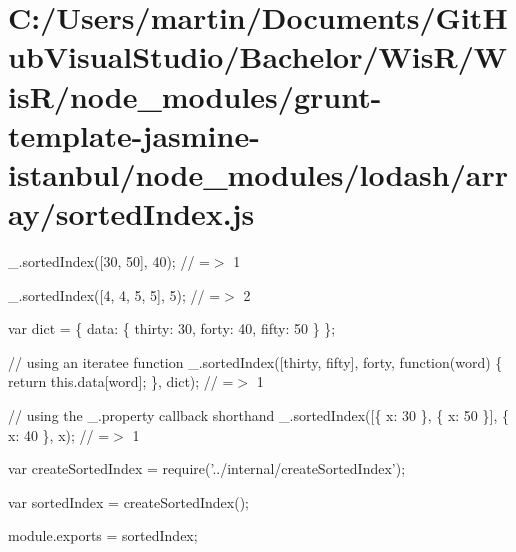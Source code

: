\hypertarget{_c_1_2_users_2martin_2_documents_2_git_hub_visual_studio_2_bachelor_2_wis_r_2_wis_r_2node_module6b893fce4ef2730ca2766808678960da}{}\section{C\+:/\+Users/martin/\+Documents/\+Git\+Hub\+Visual\+Studio/\+Bachelor/\+Wis\+R/\+Wis\+R/node\+\_\+modules/grunt-\/template-\/jasmine-\/istanbul/node\+\_\+modules/lodash/array/sorted\+Index.\+js}
\+\_\+.\+sorted\+Index(\mbox{[}30, 50\mbox{]}, 40); // =$>$ 1

\+\_\+.\+sorted\+Index(\mbox{[}4, 4, 5, 5\mbox{]}, 5); // =$>$ 2

var dict = \{ \textquotesingle{}data\textquotesingle{}\+: \{ \textquotesingle{}thirty\textquotesingle{}\+: 30, \textquotesingle{}forty\textquotesingle{}\+: 40, \textquotesingle{}fifty\textquotesingle{}\+: 50 \} \};

// using an iteratee function \+\_\+.\+sorted\+Index(\mbox{[}\textquotesingle{}thirty\textquotesingle{}, \textquotesingle{}fifty\textquotesingle{}\mbox{]}, \textquotesingle{}forty\textquotesingle{}, function(word) \{ return this.\+data\mbox{[}word\mbox{]}; \}, dict); // =$>$ 1

// using the {\ttfamily \+\_\+.\+property} callback shorthand \+\_\+.\+sorted\+Index(\mbox{[}\{ \textquotesingle{}x\textquotesingle{}\+: 30 \}, \{ \textquotesingle{}x\textquotesingle{}\+: 50 \}\mbox{]}, \{ \textquotesingle{}x\textquotesingle{}\+: 40 \}, \textquotesingle{}x\textquotesingle{}); // =$>$ 1


\begin{DoxyCodeInclude}
var createSortedIndex = require(\textcolor{stringliteral}{'../internal/createSortedIndex'});

var sortedIndex = createSortedIndex();

module.exports = sortedIndex;
\end{DoxyCodeInclude}
 